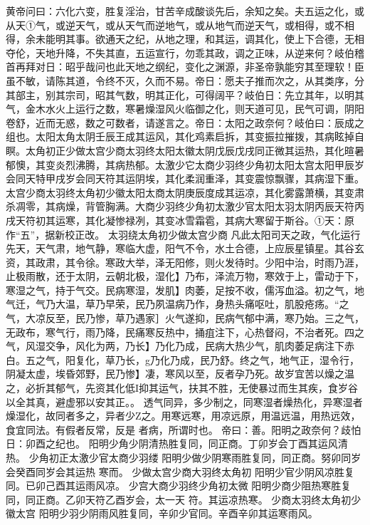 \documentclass[a4paper,12pt,UTF8,twoside]{ctexbook}
\begin{document}
黄帝问曰：六化六变，胜复淫治，甘苦辛成酸谈先后，余知之矣。夫五运之化，或从天①气，或逆天气，或从天气而逆地气，或从地气而逆天气，或相得，或不相得，余未能明其事。欲通天之纪，从地之理，和其运，调其化，使上下合德，无相夺伦，天地升降，不失其直，五运宣行，勿乖其政，调之正味，从逆来何？岐伯稽首再拜对日：昭乎哉问也此天地之纲纪，变化之渊源，非圣帝孰能穷其至理软！臣虽不敏，请陈其道，令终不灭，久而不易。帝日：愿夫子推而次之，从其类序，分其部主，别其宗司，昭其气数，明其正化，可得阔平？岐伯日：先立其年，以明其气，金木水火上运行之数，寒暑燥湿风火临御之化，则天道可见，民气可调，阴阳卷舒，近而无惑，数之可数者，请遂言之。帝日：太阳之政奈何？岐伯曰：辰成之组也。太阳太角太阴壬辰王成其运风，其化鸡素启拆，其变振拉摧拨，其病眩掉自瞑。太角初正少做太宫少商太羽终太阳太徽太阴戊辰戊戌同正微其运热，其化暄暑郁懊，其变炎烈沸腾，其病热郁。太激少它太商少羽终少角初太阳太宫太阳甲辰岁会同天特甲戌岁会同天符其运阴埃，其化柔润重泽，其变震惊飘骤，其病湿下重。太宫少商太羽终太角初少徽太阳太商太阴庚辰度成其运凉，其化雾露萧横，其变肃杀凋零，其病燥，背管胸满。大商少羽终少角初太激少官太阳太羽太阴丙辰天符丙戌天符初其运寒，其化凝惨禄冽，其变冰雪霜雹，其病大寒留于斯谷。①天：原作“五”，据新校正改。
太羽绕太角初少做太宫少商
凡此太阳司天之政，气化运行先天，天气肃，地气静，寒临大虚，阳气不令，水土合德，上应辰星镇星。其谷玄资，其政肃，其令徐。寒政大举，泽无阳修，则火发待时。少阳中治，时雨乃涯，止极雨散，还于太阴，云朝北极，湿化】乃布，泽流万物，寒效于上，雷动于下，寒湿之气，持于气交。民病寒湿，发肌】肉萎，足按不收，儒泻血溢。初之气，地气迁，气乃大温，草乃早荣，民乃夙温病乃作，身热头痛呕吐，肌股疮疡。“之气，大凉反至，民乃惨，草乃遇家］火气遂抑，民病气郁中满，寒乃始。三之气，无政布，寒气行，雨乃降，民痛寒反热中，捅疽注下，心热督闷，不治者死。四之气，风湿交争，风化为两，乃长】乃化乃成，民病大热少气，肌肉萎足病注下赤白。五之气，阳复化，草乃长，g乃化乃成，民乃舒。终之气，地气正，湿令行，阴凝太虚，埃昏郊野，民乃惨】凄，寒风以至，反者孕乃死。故岁宜苦以燥之温之，必折其郁气，先资其化低I抑其运气，扶其不胜，无使暴过而生其疾，食岁谷以全其真，避虚邪以安其正。。
透气同异，多少制之，同寒湿者燥热化，异寒湿者燥湿化，故同者多之，异者少Z之。用寒远寒，用凉远原，用温远温，用热远效，食宜同法。有假者反常，反是
者病，所谓时也。
帝曰：善。阳明之政奈何？歧怕日：卯酉之纪也。
阳明少角少阴清热胜复同，同正商。丁卯岁会丁酉其运风清热。
少角初正太激少官太商少羽缕
阳明少做少阴寒雨胜复同，同正商。努卯同岁会癸酉同岁会其运热
寒而。
少做太宫少商大羽终太角初
阳明少官少阴风凉胜复同。已卯己酉其运雨风凉。
少宫大商少羽终少角初太微
阳明少商少阻热寒胜复同，同正商。乙卯天符乙酉岁会，太一天
符。其运凉热寒。
少商太羽终太角初少徽太宫
阳明少羽少阴雨风胜复同，辛卯少官同。辛酉辛卯其运寒雨风。
\end{document}
